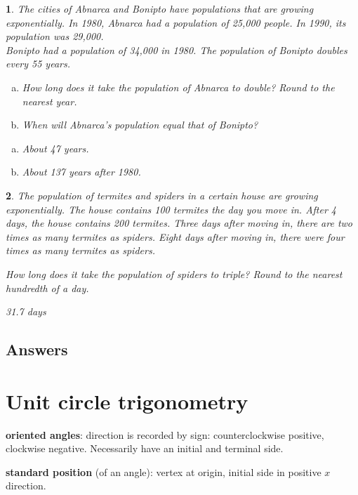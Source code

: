 \documentclass{amsbook}
\newcommand{\ssp}{\begin{enumerate}[(a), leftmargin=*]}
\newcommand{\esp}{\end{enumerate}}
\newtheorem{exc}{}
\newenvironment{ex}{\begin{exc}\normalfont}{\end{exc}}
\numberwithin{section}{chapter}
\numberwithin{equation}{chapter}
\begin{document}
\begin{ex} %
	The cities of Abnarca and Bonipto have populations that are growing exponentially. In 1980, Abnarca had a population of 25,000 people. In 1990, its population was 29,000.\\
	Bonipto had a population of 34,000 in 1980. The population of Bonipto doubles every 55 years.
	\ssp
	\item How long does it take the population of Abnarca to double? Round to the nearest year.
	\item When will Abnarca's population equal that of Bonipto?
	\esp
	\begin{sol}
		\ssp
		\item About 47 years.
		\item About 137 years after 1980.
		\esp
	\end{sol}
\end{ex}

\begin{ex} %
	The population of termites and spiders in a certain house are growing exponentially. The house contains 100 termites the day you move in. After 4 days, the house contains 200 termites. Three days after moving in, there are two times as many termites as spiders. Eight days after moving in, there were four times as many termites as spiders.
	
	How long does it take the population of spiders to triple? Round to the nearest hundredth of a day.
	\begin{sol}
		31.7 days
	\end{sol}
\end{ex}

\subsection*{Answers \nopunct} \hfill
\begin{multicols}{2}
	
\end{multicols}


\newpage
\section{Unit circle trigonometry}

\textbf{oriented angles}: direction is recorded by sign: counterclockwise positive, clockwise negative. Necessarily have an initial and terminal side.

\textbf{standard position} (of an angle): vertex at origin, initial side in positive $x$ direction.
\end{document}
